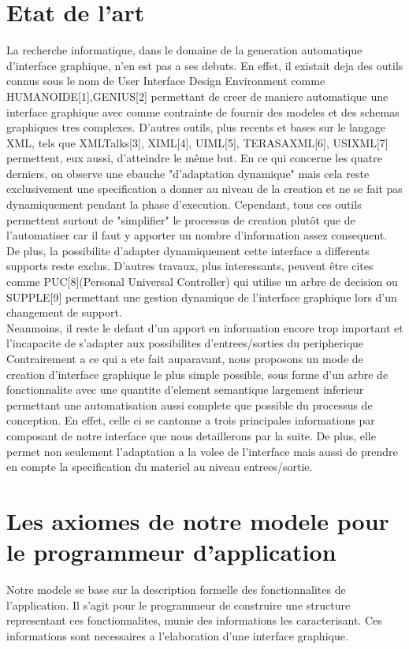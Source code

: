 \documentclass[fleqn]{article-hermes}
\begin{document}
\section{Etat de l'art}
La recherche informatique, dans le domaine de la generation
automatique d'interface graphique, n'en est pas a ses debuts.
En effet, il existait deja des outils connus sous le nom de
User Interface Design Environment comme HUMANOIDE[1],GENIUS[2] permettant
de creer de maniere automatique une interface graphique avec comme contrainte
de fournir des modeles et des schemas graphiques tres complexes.
D'autres outils, plus recents et bases sur le langage XML,
tels que XMLTalks[3], XIML[4], UIML[5], TERASAXML[6], USIXML[7] permettent, eux aussi,
d'atteindre le même but. En ce qui concerne les quatre derniers, on observe une ebauche
"d'adaptation dynamique" mais cela reste exclusivement une specification
a donner au niveau de la creation et ne se fait pas dynamiquement pendant la phase d'execution.
Cependant, tous ces outils permettent surtout de "simplifier" le processus
de creation plutôt que de l'automatiser car il faut y apporter
un nombre d'information assez consequent. De plus, la possibilite
d'adapter dynamiquement cette interface a differents supports
reste exclus. D'autres travaux, plus interessants, peuvent être cites
comme PUC[8](Personal Universal Controller) qui utilise un arbre
de decision ou SUPPLE[9] permettant
une gestion dynamique de l'interface graphique lors d'un changement
de support.\\
Neanmoins, il reste le defaut d'un apport en information encore trop
important et l'incapacite de s'adapter aux possibilites d'entrees/sorties
du peripherique\\
Contrairement a ce qui a ete fait auparavant, nous proposons un mode
de creation d'interface graphique le plus simple possible, sous
forme d'un arbre de fonctionnalite avec une quantite d'element semantique
largement inferieur permettant une automatisation aussi complete 
que possible du processus de conception.
En effet, celle ci se cantonne a trois principales informations par composant de notre interface
que nous detaillerons par la suite.
De plus, elle permet non seulement l'adaptation a la volee de l'interface mais aussi
de prendre en compte la specification du materiel au niveau entrees/sortie.


\section{Les axiomes de notre modele pour le programmeur
  d'application}
Notre modele se base sur la description formelle des fonctionnalites de l'application.
Il s'agit pour le programmeur de construire une structure representant ces fonctionnalites,
munie des informations les caracterisant. Ces informations sont necessaires a l'elaboration d'une interface graphique.
\end{document}
